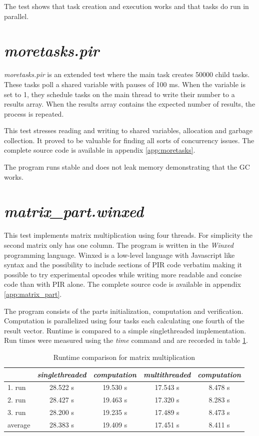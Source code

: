 \documentclass[bachelor,english]{hgbthesis}
\begin{document}
The test shows that task creation and execution works and that tasks do run in parallel.

\section{\textit{moretasks.pir}}

\textit{moretasks.pir} is an extended test where the main task creates 50000 child tasks. These tasks poll a shared variable with pauses of 100 ms. When the variable is set to 1, they schedule tasks on the main thread to write their number to a results array. When the results array contains the expected number of results, the process is repeated.

This test stresses reading and writing to shared variables, allocation and garbage collection. It proved to be valuable for finding all sorts of concurrency issues. The complete source code is available in appendix \ref{app:moretasks}.

The program runs stable and does not leak memory demonstrating that the GC works.

\section{\textit{matrix\_part.winxed}}

This test implements matrix multiplication \cite{MatrixMult} using four threads. For simplicity the second matrix only has one column. The program is written in the \textit{Winxed} programming language. Winxed is a low-level language with Javascript like syntax and the possibility to include sections of PIR code verbatim making it possible to try experimental opcodes while writing more readable and concise code than with PIR alone. The complete source code is available in appendix \ref{app:matrix_part}.

The program consists of the parts initialization, computation and verification. Computation is parallelized using four tasks each calculating one fourth of the result vector. Runtime is compared to a simple singlethreaded implementation. Run times were measured using the \textit{time} command and are recorded in table \ref{benchmark:matrix}.

\begin{table}
\caption{Runtime comparison for matrix multiplication}
\label{benchmark:matrix}
\begin{tabular}{|l||c|c||c|c|} \hline
& \emph{singlethreaded} & \emph{computation} & \emph{multithreaded} & \emph{computation} \\
\hline
1. run  & 28.522 s & 19.530 s & 17.543 s & 8.478 s \\
\hline
2. run  & 28.427 s & 19.463 s & 17.320 s & 8.283 s \\
\hline
3. run  & 28.200 s & 19.235 s & 17.489 s & 8.473 s \\
\hline
average & 28.383 s & 19.409 s & 17.451 s & 8.411 s \\
\hline
\end{tabular}
\end{table}
\end{document}
